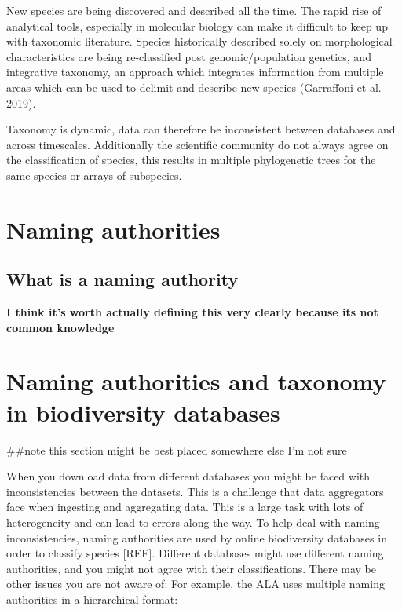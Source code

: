 \documentclass[
  letterpaper,
  DIV=11,
  numbers=noendperiod,
  oneside]{scrreprt}
\begin{document}
New species are being discovered and described all the time. The rapid
rise of analytical tools, especially in molecular biology can make it
difficult to keep up with taxonomic literature. Species historically
described solely on morphological characteristics are being
re-classified post genomic/population genetics, and integrative
taxonomy, an approach which integrates information from multiple areas
which can be used to delimit and describe new species (Garraffoni et al.
2019).

Taxonomy is dynamic, data can therefore be inconsistent between
databases and across timescales. Additionally the scientific community
do not always agree on the classification of species, this results in
multiple phylogenetic trees for the same species or arrays of
subspecies.

\hypertarget{naming-authorities}{%
\section{Naming authorities}\label{naming-authorities}}

\hypertarget{what-is-a-naming-authority}{%
\subsection{What is a naming
authority}\label{what-is-a-naming-authority}}

\textbf{I think it's worth actually defining this very clearly because
its not common knowledge}

\hypertarget{naming-authorities-and-taxonomy-in-biodiversity-databases}{%
\section{Naming authorities and taxonomy in biodiversity
databases}\label{naming-authorities-and-taxonomy-in-biodiversity-databases}}

\#\#note this section might be best placed somewhere else I'm not sure

When you download data from different databases you might be faced with
inconsistencies between the datasets. This is a challenge that data
aggregators face when ingesting and aggregating data. This is a large
task with lots of heterogeneity and can lead to errors along the way. To
help deal with naming inconsistencies, naming authorities are used by
online biodiversity databases in order to classify species {[}REF{]}.
Different databases might use different naming authorities, and you
might not agree with their classifications. There may be other issues
you are not aware of: For example, the ALA uses multiple naming
authorities in a hierarchical format:
\end{document}
